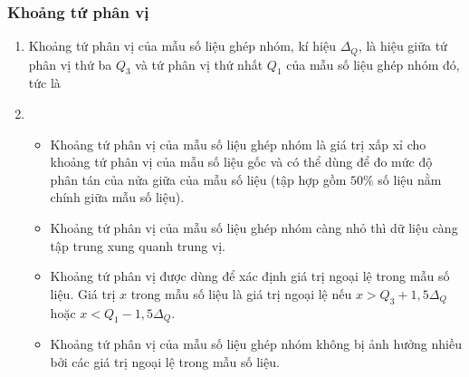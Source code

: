 \subsubsection{Khoảng tứ phân vị}
\begin{enumerate}[\iconMT] 
	\item {}
	Khoảng tứ phân vị của mẫu số liệu ghép nhóm, kí hiệu $\Delta_Q$, là hiệu giữa tứ phân vị thứ ba $Q_3$ và tứ phân vị thứ nhất $Q_1$ của mẫu số liệu ghép nhóm đó, tức là 
	\item {}
	\begin{itemize}
		\item [\iconCH] Khoảng tứ phân vị của mẫu số liệu ghép nhóm là giá trị xấp xỉ cho khoảng tứ phân vị của mẫu số liệu gốc và có thể dùng để đo mức độ phân tán của nửa giữa của mẫu số liệu (tập hợp gồm $50 \%$ số liệu nằm chính giữa mẫu số liệu).
		\item [\iconCH] Khoảng tứ phân vị của mẫu số liệu ghép nhóm càng nhỏ thì dữ liệu càng tập trung xung quanh trung vị.
		\item [\iconCH] Khoảng tứ phân vị được dùng để xác định giá trị ngoại lệ trong mẫu số liệu. Giá trị $x$ trong mẫu số liệu là giá trị ngoại lệ nếu $x>Q_3+1,5 \Delta_Q$ hoặc $x<Q_1-1,5 \Delta_Q$.
		\item [\iconCH] Khoảng tứ phân vị của mẫu số liệu ghép nhóm không bị ảnh hưởng nhiều bởi các giá trị ngoại lệ trong mẫu số liệu.
	\end{itemize}
\end{enumerate}


